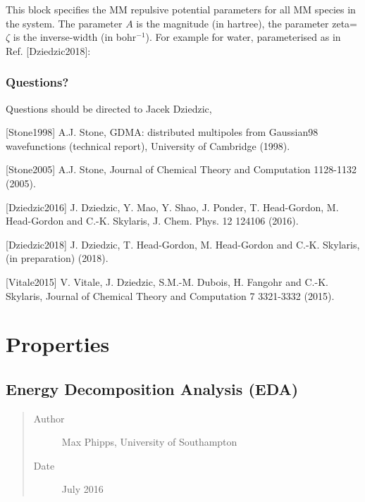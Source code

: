 \documentclass[letterpaper,10pt,english]{sphinxmanual}
\begin{document}
\begin{itemize}
This block specifies the MM repulsive potential parameters for all MM
species in the system. The parameter \(A\) is the magnitude (in
hartree), the parameter zeta=\(\zeta\) is the inverse-width (in
bohr\(^{-1}\)). For example for water, parameterised as in
Ref. {[}Dziedzic2018{]}:

%
\begin{sphinxVerbatim}[commandchars=\\\{\}]
 
    
   
 
\end{sphinxVerbatim}

\end{itemize}


\subsection{Questions?}
\label{\detokenize{tinktep:questions}}
Questions should be directed to Jacek Dziedzic,

{[}Stone1998{]} A.J. Stone, GDMA: distributed multipoles from Gaussian98 wavefunctions (technical report), University of Cambridge (1998).

{[}Stone2005{]} A.J. Stone, Journal of Chemical Theory and Computation  1128-1132 (2005).

{[}Dziedzic2016{]} J. Dziedzic, Y. Mao, Y. Shao, J. Ponder, T. Head-Gordon, M. Head-Gordon and C.-K. Skylaris, J. Chem. Phys.  12 124106 (2016).

{[}Dziedzic2018{]} J. Dziedzic, T. Head-Gordon, M. Head-Gordon and C.-K. Skylaris, (in preparation) (2018).

{[}Vitale2015{]} V. Vitale, J. Dziedzic, S.M.-M. Dubois, H. Fangohr and C.-K. Skylaris, Journal of Chemical Theory and Computation  7 3321-3332 (2015).


\chapter{Properties}
\label{\detokenize{index_properties:properties}}\label{\detokenize{index_properties::doc}}

\section{Energy Decomposition Analysis (EDA)}
\label{\detokenize{EDA::doc}}\label{\detokenize{EDA:energy-decomposition-analysis-eda}}\begin{quote}\begin{description}
\item[{Author}] \leavevmode
Max Phipps, University of Southampton

\item[{Date}] \leavevmode
July 2016

\end{description}\end{quote}
\end{document}
